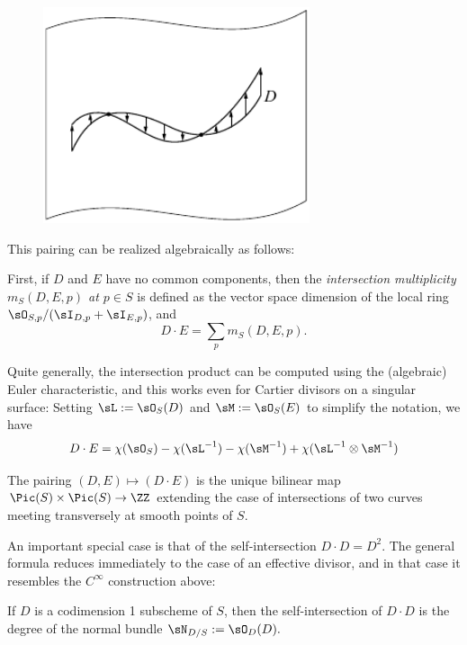 \begin{figure}[htbp]   %
\centerline {\includegraphics[height=2.5in]{"main/Fig02-strip"}}
\end{figure}

This pairing can be realized algebraically as follows:

First, if $D$ and $E$ have no common
components, then the \emph{intersection multiplicity $m_S(D,E,p)$ at $p\in S$}
is defined as the vector space dimension of the local ring $\sO_{S,p}/(\sI_{D,p}+\sI_{E,p})$, and 
$$
D\cdot E = \sum_p m_S(D,E,p).
$$

Quite generally, 
the intersection product can be computed using the (algebraic) Euler characteristic, and this works even for Cartier divisors on a singular surface: Setting $\sL := \sO_S(D)$ and
$\sM := \sO_S(E)$ to simplify the notation, we have 
$$
D\cdot E = \chi(\sO_S)-\chi(\sL^{-1}) -\chi(\sM^{-1}) +\chi(\sL^{-1}\otimes \sM^{-1}) 
$$

\begin{theorem} The pairing $(D,E) \mapsto (D\cdot E)$ is the unique bilinear map
$\Pic(S) \times \Pic(S) \to \ZZ$ extending the case of intersections of two curves meeting transversely at smooth points of $S$. 
\end{theorem}

An important special case is that of the self-intersection $D\cdot D = D^2$. The general formula reduces immediately to the case of an effective divisor, and in that case it resembles the $C^{\infty}$ construction above:

\begin{corollary}\label{self-intersection number}
If $D$ is a codimension 1 subscheme of $S$, then the self-intersection of $D\cdot D$ is the degree of the normal bundle
$\sN_{D/S} := \sO_{D}(D).$
\end{corollary}

